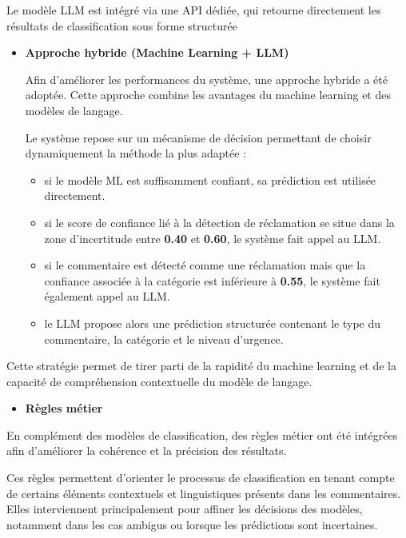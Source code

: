 \documentclass[12pt,a4paper,oneside]{report}
\begin{document}
Le modèle LLM est intégré via une API dédiée, qui retourne directement les résultats de classification sous forme structurée

\begin{itemize}
    \item \textbf{Approche hybride (Machine Learning + LLM)}

Afin d’améliorer les performances du système, une approche hybride a été adoptée. Cette approche combine les avantages du machine learning et des modèles de langage.

Le système repose sur un mécanisme de décision permettant de choisir dynamiquement la méthode la plus adaptée :

\begin{itemize}
    \item si le modèle ML est suffisamment confiant, sa prédiction est utilisée directement.
    \item si le score de confiance lié à la détection de réclamation se situe dans la zone d’incertitude entre \textbf{0.40} et \textbf{0.60}, le système fait appel au LLM.
    \item si le commentaire est détecté comme une réclamation mais que la confiance associée à la catégorie est inférieure à \textbf{0.55}, le système fait également appel au LLM.
    \item le LLM propose alors une prédiction structurée contenant le type du commentaire, la catégorie et le niveau d’urgence.
\end{itemize}

\end{itemize}

Cette stratégie permet de tirer parti de la rapidité du machine learning et de la capacité de compréhension contextuelle du modèle de langage.

\begin{itemize}
    \item \textbf{Règles métier}
\end{itemize}

En complément des modèles de classification, des règles métier ont été intégrées afin d’améliorer la cohérence et la précision des résultats.

Ces règles permettent d’orienter le processus de classification en tenant compte de certains éléments contextuels et linguistiques présents dans les commentaires. Elles interviennent principalement pour affiner les décisions des modèles, notamment dans les cas ambigus ou lorsque les prédictions sont incertaines.
\end{document}
